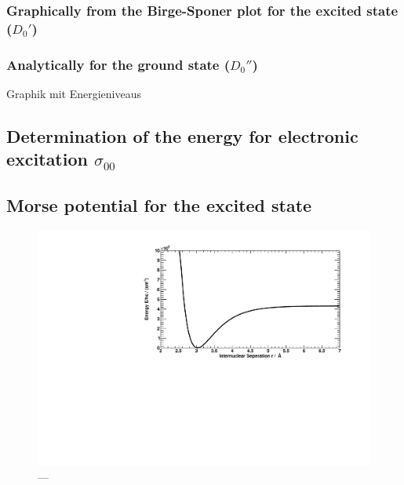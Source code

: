 \subsubsection{Graphically from the Birge-Sponer plot for the excited state ($D_0'$)}

\subsubsection{Analytically for the ground state ($D_0''$)}

Graphik mit Energieniveaus

\subsection{Determination of the energy for electronic excitation $\sigma_{00}$}

\subsection{Morse potential for the excited state}


\begin{figure}[H]
\begin{center}
  \includegraphics[width=\textwidth]{../img/morse.pdf}
  \caption[---]{---}
  \label{img:morse}
\end{center}
\end{figure}

